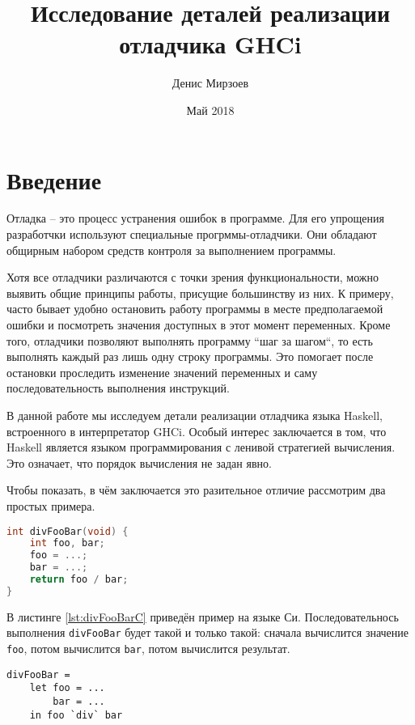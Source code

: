 \documentclass[14pt]{extarticle}
\title{Исследование деталей реализации отладчика GHCi}
\author{Денис Мирзоев}
\date{Май 2018}
\def\code#1{\texttt{#1}}
\begin{document}
\maketitle 
\newpage

\tableofcontents
\newpage

\section{Введение}

Отладка -- это процесс устранения ошибок в программе. Для его упрощения
разработчки используют специальные прогрммы-отладчики. Они обладают общирным
набором средств контроля за выполнением программы. 

Хотя все отладчики различаются с точки зрения функциональности, можно выявить
общие принципы работы, присущие большинству из них. К примеру, часто бывает
удобно остановить работу программы в месте предполагаемой ошибки и посмотреть
значения доступных в этот момент переменных. Кроме того, отладчики позволяют
выполнять программу ``шаг за шагом``, то есть выполнять каждый раз лишь одну
строку программы. Это помогает после остановки проследить изменение значений
переменных и саму последовательность выполнения инструкций.

В данной работе мы исследуем детали реализации отладчика языка Haskell,
встроенного в интерпретатор GHCi. Особый интерес заключается в том, что
Haskell является языком программирования с ленивой стратегией вычисления. Это
означает, что порядок вычисления не задан явно.

Чтобы показать, в чём заключается это разительное отличие рассмотрим два
простых примера.

\begin{lstlisting}[language=c, caption=Делим два числа на Си, label={lst:divFooBarC}]
int divFooBar(void) {
    int foo, bar;
    foo = ...;
    bar = ...;
    return foo / bar;
}
\end{lstlisting}

В листинге \ref{lst:divFooBarC} приведён пример на языке Си. Последовательнось
выполнения \code{divFooBar} будет такой и только такой: сначала вычислится
значение \code{foo}, потом вычислится \code{bar}, потом вычислится результат.

\begin{lstlisting}[caption=Делим два числа на Haskell, label={lst:divFooBarHaskell}]
divFooBar =
    let foo = ...
        bar = ...
    in foo `div` bar
\end{lstlisting}
\end{document}
